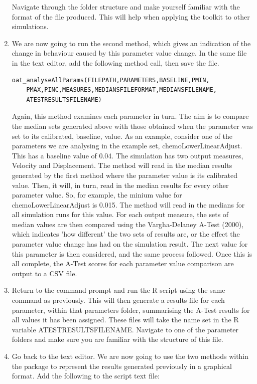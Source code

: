 \documentclass[a4paper,11pt]{article}
\begin{document}
\begin{enumerate}
Navigate through the folder structure and make yourself familiar with the format of the file produced. This will help when applying the toolkit to other simulations.

\item We are now going to run the second method, which gives an indication of the change in behaviour caused by this parameter value change.  In the same file in the text editor, add the following method call, then save the file.

\begin{verbatim}
oat_analyseAllParams(FILEPATH,PARAMETERS,BASELINE,PMIN,
	PMAX,PINC,MEASURES,MEDIANSFILEFORMAT,MEDIANSFILENAME,
	ATESTRESULTSFILENAME)
\end{verbatim}

Again, this method examines each parameter in turn.  The aim is to compare the median sets generated above with those obtained when the parameter was set to its calibrated, baseline, value.  As an example, consider one of the parameters we are analysing in the example set, chemoLowerLinearAdjust.  This has a baseline value of 0.04. The simulation has two output measures, Velocity and Displacement. The method will read in the median results generated by the first method where the parameter value is its calibrated value. Then, it will, in turn, read in the median results for every other parameter value. So, for example, the minium value for chemoLowerLinearAdjust is 0.015. The method will read in the medians for all simulation runs for this value. For each output measure, the sets of median values are then compared using the Vargha-Delaney A-Test (2000), which indicates 'how different' the two sets of results are, or the effect the parameter value change has had on the simulation result. The next value for this parameter is then considered, and the same process followed.  Once this is all complete, the A-Test scores for each parameter value comparison are output to a CSV file.\\

\item Return to the command prompt and run the R script using the same command as previously. This will then generate a results file for each parameter, within that parameters folder, summarising the A-Test results for all values it has been assigned. These files will take the name set in the R variable ATESTRESULTSFILENAME.  Navigate to one of the parameter folders and make sure you are familiar with the structure of this file.

\item Go back to the text editor. We are now going to use the two methods within the package to represent the results generated previously in a graphical format. Add the following to the script text file:


\end{enumerate}
\end{document}
